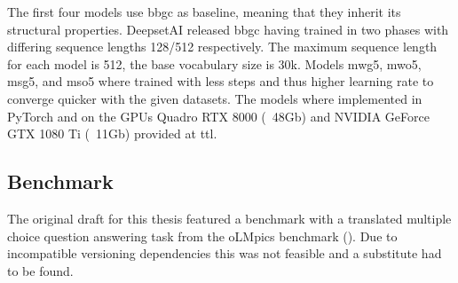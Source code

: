 The first four models use bbgc as baseline, meaning that they inherit its structural properties.
DeepsetAI released bbgc having trained in two phases with differing sequence lengths 128/512 respectively.
The maximum sequence length for each model is 512, the base vocabulary size is 30k.
Models mwg5, mwo5, msg5, and mso5 where trained with less steps and thus higher learning rate to converge quicker with the given datasets.
The models where implemented in PyTorch \textcite{pytorch} and  on the GPUs Quadro RTX 8000 (~48Gb) and NVIDIA GeForce GTX 1080 Ti (~11Gb) provided at \ac{ttl}.


\subsection{Benchmark}
\label{subsec:benchmark-implementation}
The original draft for this thesis featured a benchmark with a translated multiple choice question answering task from the oLMpics benchmark (\textcite{olmpics}).
Due to incompatible versioning dependencies this was not feasible and a substitute had to be found.
